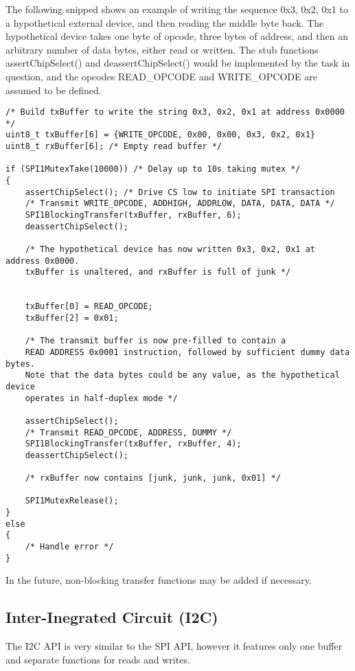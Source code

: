 \documentclass{article}
\begin{document}
The following snipped shows an example of writing the sequence 0x3, 0x2, 0x1 to
a hypothetical external device, and then reading the middle byte back.
The hypothetical device takes one byte of opcode, three bytes of address, and then
an arbitrary number of data bytes, either read or written.
The stub functions
assertChipSelect() and deassertChipSelect() would be implemented by the task in question,
and the opcodes READ\_OPCODE and WRITE\_OPCODE are assumed to be defined.

\begin{verbatim}
/* Build txBuffer to write the string 0x3, 0x2, 0x1 at address 0x0000 */
uint8_t txBuffer[6] = {WRITE_OPCODE, 0x00, 0x00, 0x3, 0x2, 0x1}
uint8_t rxBuffer[6]; /* Empty read buffer */

if (SPI1MutexTake(10000)) /* Delay up to 10s taking mutex */
{  
    assertChipSelect(); /* Drive CS low to initiate SPI transaction
    /* Transmit WRITE_OPCODE, ADDHIGH, ADDRLOW, DATA, DATA, DATA */
    SPI1BlockingTransfer(txBuffer, rxBuffer, 6);
    deassertChipSelect();
    
    /* The hypothetical device has now written 0x3, 0x2, 0x1 at address 0x0000.
    txBuffer is unaltered, and rxBuffer is full of junk */
    
    
    txBuffer[0] = READ_OPCODE;
    txBuffer[2] = 0x01;
    
    /* The transmit buffer is now pre-filled to contain a 
    READ ADDRESS 0x0001 instruction, followed by sufficient dummy data bytes. 
    Note that the data bytes could be any value, as the hypothetical device 
    operates in half-duplex mode */
    
    assertChipSelect();
    /* Transmit READ_OPCODE, ADDRESS, DUMMY */
    SPI1BlockingTransfer(txBuffer, rxBuffer, 4);
    deassertChipSelect();
    
    /* rxBuffer now contains [junk, junk, junk, 0x01] */
    
    SPI1MutexRelease();
}
else
{
    /* Handle error */
}

\end{verbatim}

In the future, non-blocking transfer functions may be added if necessary.

\subsection{Inter-Inegrated Circuit (I2C)}
The I2C API is very similar to the SPI API, however it features only one buffer
and separate functions for reads and writes.
\end{document}
